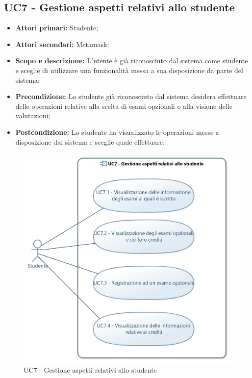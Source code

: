 \documentclass[AnalisiDeiRequisiti.tex]{subfiles}
\begin{document}
\subsection{UC7 - Gestione aspetti relativi allo studente}
\begin{itemize}
	\item \textbf{Attori primari:} Studente;\\
	\item \textbf{Attori secondari:} Metamask;
	\item \textbf{Scopo e descrizione:} L'utente è già riconosciuto dal sistema come studente e sceglie di utilizzare una funzionalità messa a sua disposizione da parte del sistema;\\
	\item \textbf{Precondizione:} Lo studente già riconosciuto dal sistema desidera effettuare delle operazioni relative alla scelta di esami opzionali o alla visione delle valutazioni;\\
	\item \textbf{Postcondizione:} Lo studente ha visualizzato le operazioni messe a disposizione dal sistema e sceglie quale effettuare.\\
\end{itemize}

\begin{figure}[H]
	\centering
	\includegraphics[width=0.8\linewidth]{UC7.jpg}
	\caption{UC7 - Gestione aspetti relativi allo studente}
	\label{fig:UC7 - Gestione aspetti relativi allo studente}
\end{figure}
\end{document}
